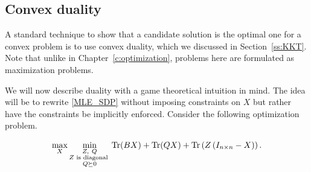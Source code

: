 \subsection{Convex duality}

A standard technique to show that a candidate solution is the optimal one for a convex problem is to use convex duality, which we discussed in Section~\ref{ss:KKT}. Note that unlike in Chapter~\ref{c:optimization}, problems here are formulated as maximization problems.

We will now describe duality with a game theoretical intuition in mind. The idea will be to rewrite \eqref{MLE_SDP} without imposing constraints on $X$ but rather have the constraints be implicitly enforced. Consider the following optimization problem.

\begin{equation}\label{MLE_SDP_Lagrangian}
\max_{X} \min_{\substack{Z,\ Q \\ Z \text{ is diagonal } \\ Q\succeq 0}} \operatorname{Tr}(BX) + \operatorname{Tr}(QX) + \operatorname{Tr}\left(Z\left(I_{n\times n}-X\right)\right).
\end{equation}

